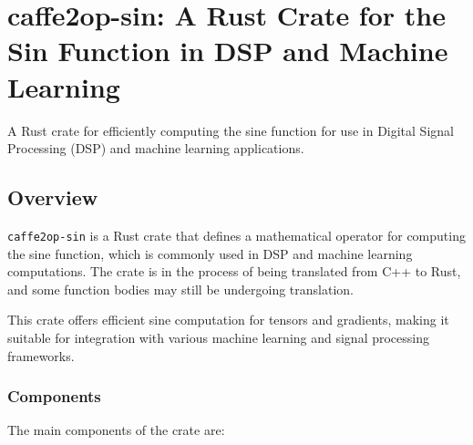 \documentclass[
]{article}
\author{}
\date{}
\begin{document}
\hypertarget{caffe2op-sin-a-rust-crate-for-the-sin-function-in-dsp-and-machine-learning}{%
\section{caffe2op-sin: A Rust Crate for the Sin Function in DSP and
Machine
Learning}\label{caffe2op-sin-a-rust-crate-for-the-sin-function-in-dsp-and-machine-learning}}

A Rust crate for efficiently computing the sine function for use in
Digital Signal Processing (DSP) and machine learning applications.

\hypertarget{overview}{%
\subsection{Overview}\label{overview}}

\texttt{caffe2op-sin} is a Rust crate that defines a mathematical
operator for computing the sine function, which is commonly used in DSP
and machine learning computations. The crate is in the process of being
translated from C++ to Rust, and some function bodies may still be
undergoing translation.

This crate offers efficient sine computation for tensors and gradients,
making it suitable for integration with various machine learning and
signal processing frameworks.

\hypertarget{components}{%
\subsubsection{Components}\label{components}}

The main components of the crate are:
\end{document}
